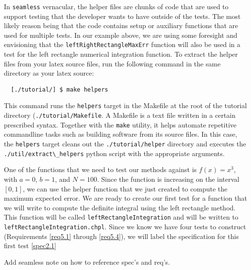 \begin{seamlessnote}
  In \lstinline{seamless} vernacular, the helper files are chunks of code that are used to support
  testing that the developer wants to have outside of the tests. The most likely reason being that
  the code contains setup or auxiliary functions that are used for multiple tests. In our example
  above, we are using some foresight and envisioning that the \lstinline{leftRightRectangleMaxErr}
  function will also be used in a test for the left rectangle numerical integration function. To 
  extract the helper files from your latex source files, run the following command in the same
  directory as your latex source:
  \begin{verbatim}
  [./tutorial/] $ make helpers
  \end{verbatim}
  This command runs the \lstinline{helpers} target in the Makefile at the root of the 
  tutorial directory (\lstinline{./tutorial/Makefile}. A Makefile is a text 
    file written in a certain prescribed syntax. Together with the \lstinline{make} utility, it 
    helps automate repetitive commandline tasks such as building software from its source files. 
    In this case, the \lstinline{helpers} target cleans out the \lstinline{./tutorial/helper} directory and
    executes the \lstinline{./util/extract\_helpers} python script with the appropriate arguments.
  \end{seamlessnote}

  One of the functions that we need to test our methods against is $f(x) = x^3$, 
  with $a=0$, $b=1$, and $N=100$.
  Since the function is increasing on the interval $[0,1]$, we can use 
  the helper function that we just created to compute the maximum expected error. We are
  ready to create our first test for a function that we will write to compute the definite
  integral using the left rectangle method. This function will be called 
  \lstinline{leftRectangleIntegration}
  and will be written to \lstinline{leftRectangleIntegration.chpl}.
  Since we know we have four tests to construct (Requirements \ref{req5.1} through \ref{req5.4}),
  we will label the specification for this first test \ref{spec2.1}
  \begin{TODO}
    Add seamless note on how to reference spec's and req's.
  \end{TODO}

